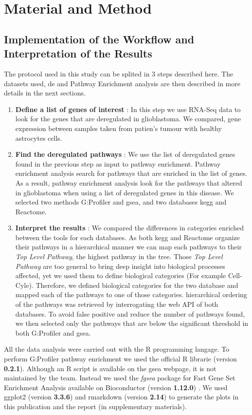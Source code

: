 \section{Material and Method}

\subsection{Implementation of the Workflow and Interpretation of the Results}

The protocol used in this study can be splited in 3 steps described here.
The datasets used, \acrfull{de} and Pathway Enrichment analysis are then described in more details in the next sections.
\begin{enumerate}
    \item \textbf{Define a list of genes of interest} : In this step we use RNA-Seq data to look for the genes that are deregulated in glioblastoma. 
    We compared, gene expression between samples taken from patien's tumour with healthy astrocytes cells.
    \item \textbf{Find the deregulated pathways} : We use the list of deregulated genes found in the previous step as input to pathway enrichment.
    Pathway enrichment analysis search for pathways that are enriched in the list of genes.
    As a result, pathway enrichment analysis look for the pathways that altered in glioblastoma when using a list of deregulated genes in this disease.
    We selected two methods G:Profiler and \acrfull{gsea}, and two databases \acrfull{kegg} and Reactome.
    \item \textbf{Interpret the results} : We compared the differences in categories enriched between the tools for each databases.
    As both \acrshort{kegg} and Reactome organize their pathways in a hierarchical manner we can map each pathways to their \textit{Top Level Pathway}, the highest pathway in the tree.
    Those \textit{Top Level Pathway} are too general to bring deep insight into biological processes affected, yet we used them to define biological categories (For example Cell-Cyle).
    Therefore, we defined biological categories for the two database and mapped each of the pathways to one of those categories.
    hierarchical ordering of the pathways was retrieved by interrogating the web API of both databases.
    To avoid false positive and reduce the number of pathways found, we then selected only the pathways that are below the significant threshold in both G:Profiler and \acrshort{gsea}.
\end{enumerate}
All the data analysis were carried out with the R programming langage.
To perform G:Profiler pathway enrichment we used the official R librarie (version \textbf{0.2.1}).
Although an R script is available on the \acrshort{gsea} webpage, it is not maintained by the team.
Instead we used the \textit{fgsea} package for Fast Gene Set Enrichment Analysis available on Bioconductor (version \textbf{1.12.0}) \cite*{Korotkevich2021}.
We used ggplot2 (version \textbf{3.3.6}) and rmarkdown (version \textbf{2.14}) to generate the plots in this publication and the report (in supplementary materials).

